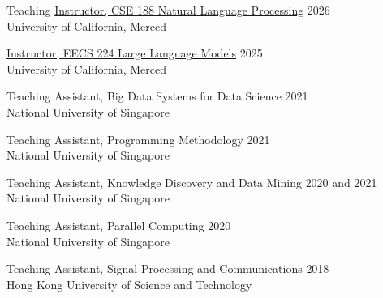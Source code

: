 \begin{rSection}{Teaching}
\href{https://wangywust.github.io/nlp-course-2026}{Instructor, CSE 188 Natural Language Processing} \hfill {2026}\\
University of California, Merced

\href{https://wangywust.github.io/llm-course-2025}{Instructor, EECS 224 Large Language Models} \hfill {2025}\\
University of California, Merced

Teaching Assistant, Big Data Systems for Data Science \hfill {2021}\\
National University of Singapore

Teaching Assistant, Programming Methodology \hfill {2021}\\
National University of Singapore

Teaching Assistant, Knowledge Discovery and Data Mining \hfill {2020 and 2021}\\
National University of Singapore

Teaching Assistant, Parallel Computing \hfill {2020}\\
National University of Singapore

Teaching Assistant, Signal Processing and Communications \hfill {2018}\\
Hong Kong University of Science and Technology

\end{rSection}
